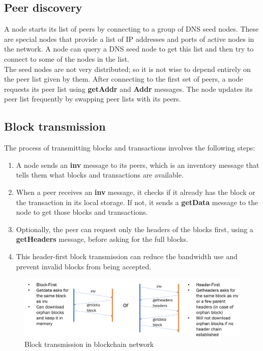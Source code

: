 \subsection{Peer discovery}
A node starts its list of peers by connecting to a group of DNS seed nodes. These are special nodes that provide a list of IP addresses and ports of active nodes in the network. A node can query a DNS seed node to get this list and then try to connect to some of the nodes in the list.\\
The seed nodes are not very distributed; so it is not wise to depend entirely on the peer list given by them. After connecting to the first set of peers, a node requests its peer list using \textbf{getAddr} and \textbf{Addr} messages. The node updates its peer list frequently by swapping peer lists with its peers.
\subsection{Block transmission}
The process of transmitting blocks and transactions involves the following steps:
\begin{enumerate}
    \item A node sends an \textbf{inv} message to its peers, which is an inventory message that tells them what blocks and transactions are available.
    \item When a peer receives an \textbf{inv} message, it checks if it already has the block or the transaction in its local storage. If not, it sends a \textbf{getData} message to the node to get those blocks and transactions.
    \item Optionally, the peer can request only the headers of the blocks first, using a \textbf{getHeaders} message, before asking for the full blocks.
    \item This header-first block transmission can reduce the bandwidth use and prevent invalid blocks from being accepted.
\end{enumerate}
\begin{figure}[h!]
    \centering
    \includegraphics[width=0.8\linewidth]{Fig/04/F3}
    \caption{Block transmission in blockchain network}
    \label{fig:f3}
\end{figure}
